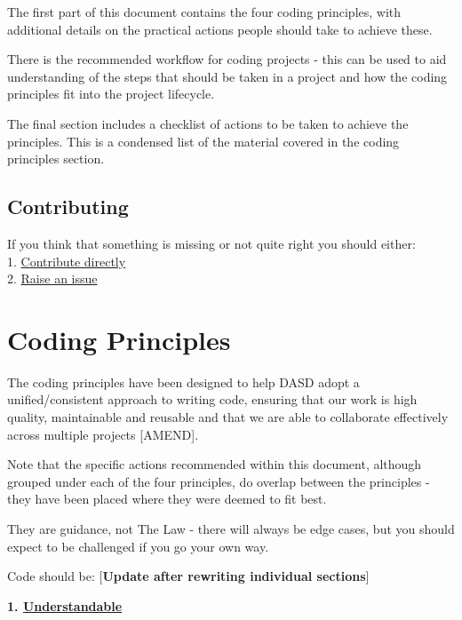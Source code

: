 \documentclass[]{book}
\begin{document}
The first part of this document contains the four coding principles, with additional details on the practical actions people should take to achieve these.

There is the recommended workflow for coding projects - this can be used to aid understanding of the steps that should be taken in a project and how the coding principles fit into the project lifecycle.

The final section includes a checklist of actions to be taken to achieve the principles. This is a condensed list of the material covered in the coding principles section.

\hypertarget{contributing}{%
\section{Contributing}\label{contributing}}

If you think that something is missing or not quite right you should either:\\
1. \protect\hyperlink{versioncontrol}{Contribute directly}\\
2. \href{https://github.com/moj-analytical-services/our-coding-standards/issues}{Raise an issue}

\hypertarget{principles}{%
\chapter{Coding Principles}\label{principles}}

The coding principles have been designed to help DASD adopt a unified/consistent approach to writing code, ensuring that our work is high quality, maintainable and reusable and that we are able to collaborate effectively across multiple projects {[}AMEND{]}.

Note that the specific actions recommended within this document, although grouped under each of the four principles, do overlap between the principles - they have been placed where they were deemed to fit best.

They are guidance, not The Law - there will always be edge cases, but you should expect to be challenged if you go your own way.

Code should be:
{[}\textbf{Update after rewriting individual sections}{]}

\textbf{1. \protect\hyperlink{understand}{Understandable}}
\end{document}
